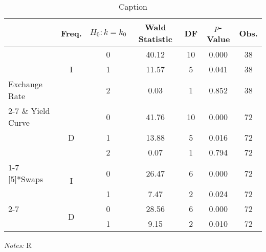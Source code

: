 \documentclass[a4paper,10pt]{article}
\begin{document}
	\begin{footnotesize}
		\begin{table}
			\centering
			\begin{threeparttable}
				\caption{Caption}
				\label{tab:test}
				\begin{tabular}{lcccccc}
					\toprule
					& Freq. & \(H_{0}: k = k_{0}\) & Wald Statistic & DF & \(p\)-Value & Obs. \\
					\midrule
					&  & 0 & 40.12 & 10 & 0.000 & 38 \\
					& I & 1 & 11.57 & 5 & 0.041 & 38 \\
					Exchange Rate &  & 2 &  0.03 & 1 & 0.852 & 38 \\
					\cmidrule(lr){2-7}
					\& Yield Curve &  & 0 & 41.76 & 10 & 0.000 & 72 \\
					& D & 1 & 13.88 & 5 & 0.016 & 72 \\
					&  & 2 &  0.07 & 1 & 0.794 & 72 \\
					\cmidrule(lr){1-7}
					\multirow{4}[5]{*}{Swaps} & \multirow{2}{*}{I} & 0 & 26.47 & 6 & 0.000 & 72 \\
					&  & 1 &  7.47 & 2 & 0.024 & 72 \\
					\cmidrule(lr){2-7}
					& \multirow{2}{*}{D} & 0 & 28.56 & 6 & 0.000 & 72 \\
					&  & 1 &  9.15 & 2 & 0.010 & 72 \\
					\bottomrule
				\end{tabular}
				\begin{tablenotes}
					\footnotesize \textit{Notes:} R
				\end{tablenotes}
			\end{threeparttable}
		\end{table}
	\end{footnotesize}
\end{document}
